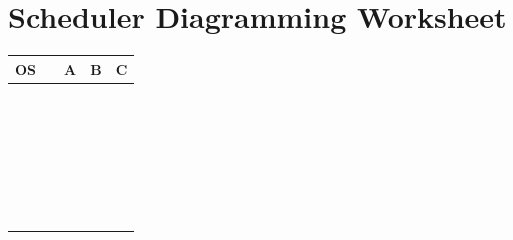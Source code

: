 \section{\large\bf Scheduler Diagramming Worksheet} 
\label{SchedWorksheet}
\renewcommand\arraystretch{1.8}%
\begin{tabular}{|p{1in}|p{0.3in}|p{1in}|p{1in}|p{1in}|}
\hline
OS      &  & A & B & C \\ \hline
        &  &   &   &   \\ \hline
        &  &   &   &   \\ \hline
        &  &   &   &   \\ \hline
        &  &   &   &   \\ \hline
        &  &   &   &   \\ \hline
        &  &   &   &   \\ \hline
        &  &   &   &   \\ \hline
        &  &   &   &   \\ \hline
        &  &   &   &   \\ \hline
        &  &   &   &   \\ \hline
        &  &   &   &   \\ \hline
        &  &   &   &   \\ \hline
        &  &   &   &   \\ \hline
        &  &   &   &   \\ \hline
        &  &   &   &   \\ \hline
        &  &   &   &   \\ \hline
        &  &   &   &   \\ \hline
        &  &   &   &   \\ \hline
        &  &   &   &   \\ \hline
        &  &   &   &   \\ \hline
        &  &   &   &   \\ \hline
        &  &   &   &   \\ \hline
        &  &   &   &   \\ \hline
        &  &   &   &   \\ \hline
        &  &   &   &   \\ \hline
        &  &   &   &   \\ \hline
        &  &   &   &   \\ \hline
        &  &   &   &   \\ \hline
\end{tabular} 
%



